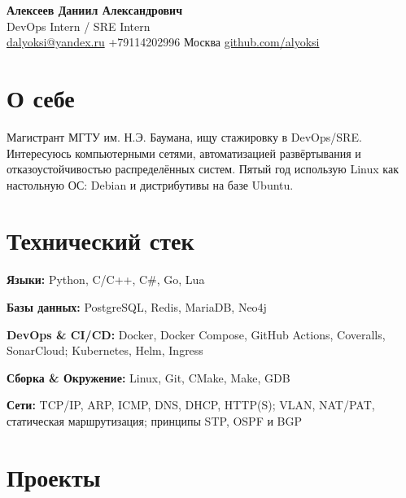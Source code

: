 \documentclass[10pt,a4paper]{article}
\begin{document}
\begin{center}
  {\LARGE\bfseries Алексеев Даниил Александрович}\\[0.15em]
  {\normalsize\color{accent} DevOps Intern / SRE Intern}\\[0.3em]
  {\small
    \href{mailto:dalyoksi@yandex.ru}{dalyoksi@yandex.ru}
    \;\textbullet\; +79114202996 \;\textbullet\; Москва
    \;\textbullet\; \href{https://github.com/alyoksi}{github.com/alyoksi}
  }
\end{center}
\vspace{-0.3em}

\section*{О себе}
Магистрант МГТУ им. Н.Э. Баумана, ищу стажировку в DevOps/SRE. Интересуюсь компьютерными сетями, автоматизацией развёртывания и отказоустойчивостью распределённых систем. Пятый год использую Linux как настольную ОС: Debian и дистрибутивы на базе Ubuntu.

\section*{Технический стек}

\textbf{Языки:} Python, C/C++, C\#, Go, Lua

\textbf{Базы данных:} PostgreSQL, Redis, MariaDB, Neo4j

\textbf{DevOps \& CI/CD:} Docker, Docker Compose, GitHub Actions, Coveralls, SonarCloud; Kubernetes, Helm, Ingress

\textbf{Сборка \& Окружение:} Linux, Git, CMake, Make, GDB

\textbf{Сети:} TCP/IP, ARP, ICMP, DNS, DHCP, HTTP(S); VLAN, NAT/PAT, статическая маршрутизация; принципы STP, OSPF и BGP

\section*{Проекты}
\end{document}
